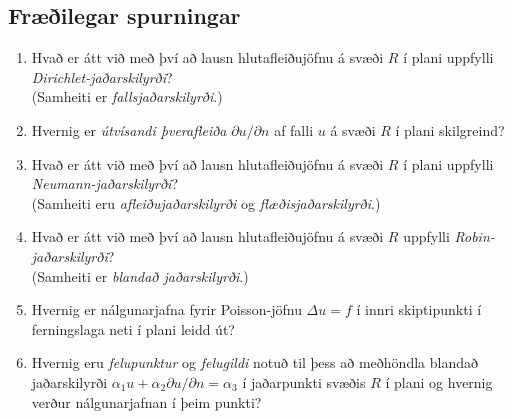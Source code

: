 \documentclass[icelandic,a4paper,12pt]{article}
\begin{document}
\subsection{Fræðilegar spurningar}
\begin{enumerate}
  \item Hvað er átt við með því að lausn hlutafleiðujöfnu á svæði  $R$
    í plani 
    uppfylli {\it Dirichlet-jaðarskilyrði}?  \\
(Samheiti er {\it fallsjaðarskilyrði}.)
\item Hvernig er {\it útvísandi þverafleiða} $\partial u/\partial n$ af 
falli $u$ á svæði $R$ í plani skilgreind?  
\item Hvað er átt við með því að lausn hlutafleiðujöfnu á svæði $R$ í plani
    uppfylli {\it Neumann-jaðarskilyrði}? \\ (Samheiti eru {\it
      afleiðujaðarskilyrði}
og {\it flæðisjaðarskilyrði}.)
  \item Hvað er átt við með því að lausn hlutafleiðujöfnu á svæði  $R$
    uppfylli {\it Robin-jaðarskilyrði}?  \\ 
(Samheiti er {\it blandað jaðarskilyrði}.)
  \item Hvernig er  nálgunarjafna fyrir 
Poisson-jöfnu $\Delta u=f$ í innri skiptipunkti
í ferningslaga neti í plani leidd út? 
  \item Hvernig eru {\it felupunktur}  og {\it felugildi} notuð til
    þess að meðhöndla blandað jaðarskilyrði $\alpha_1 u+\alpha_2
    \partial u/\partial n=\alpha_3$ í jaðarpunkti svæðis $R$ í plani
    og hvernig verður nálgunarjafnan í þeim punkti? 
  \end{enumerate}
\end{document}
